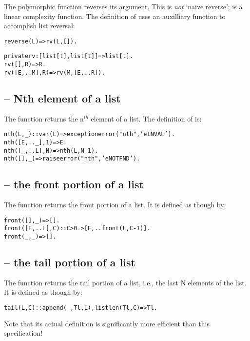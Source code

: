 The  polymorphic function reverses its argument. This is \emph{not} `naive reverse';  is a linear complexity function. The definition of  uses an auxilliary function to accomplish list reversal:
\begin{alltt}
reverse(L) => rv(L,[]).

private rv:[list[t],list[t]]=>list[t].
rv([],R) => R.
rv([E,..M],R) => rv(M,[E,..R]).
\end{alltt}

\subsection{ -- Nth element of a list}
\label{misc:nth}


The  function returns the n$^{th}$ element of a list. The definition of  is:
\begin{alltt}
nth(L,\_)::var(L)=>exception error("nth",'eINVAL').
nth([E,..\_],1) => E.
nth([\_,..L],N) => nth(L,N-1).
nth([],\_) => raise error("nth",'eNOTFND').
\end{alltt}

\subsection{ -- the front portion of a list}
\label{stdlib:front}

The  function returns the front portion of a list. It is defined as though by:
\begin{alltt}
front([],\_)=>[].
front([E,..L],C)::C>0 => [E,..front(L,C-1)].
front(\_,\_) => [].
\end{alltt}

\subsection{ -- the tail portion of a list}
\label{stdlib:tail}

The  function returns the tail portion of a list, i.e., the last N elements of the list. It is defined as though by:
\begin{alltt}
tail(L,C)::append(_,Tl,L), listlen(Tl,C) => Tl.
\end{alltt}
Note that its actual definition is significantly more efficient than this specification!


